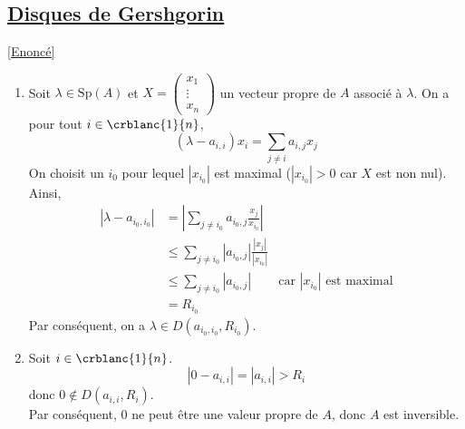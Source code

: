 \documentclass[8pt]{book}
\begin{document}
	\subsection{\underline{Disques de Gershgorin} }
	\label{Disques de Gershgorin corrigé}
	\textcolor{blue}{\hyperref[Disques de Gershgorin]{[Enoncé]}}\\
	\begin{enumerate}[leftmargin=*]
			\item Soit $\lambda\in\text{Sp}(A)$ et $X=\begin{pmatrix}
			x_1\\ \vdots \\ x_n
				\end{pmatrix}$ un vecteur propre de $A$ associé à $\lambda$.
			On a pour tout $i\in\crblanc{1}{n}$, \[(\lambda-a_{i,i})x_i=\sum_{j\ne i}a_{i,j}x_j\]
			On choisit un $i_0$ pour lequel $|x_{i_0}|$ est maximal ($|x_{i_0}|>0$ car $X$ est non nul). Ainsi, 
			\begin{align*}
				|\lambda-a_{i_0,i_0}|&=\left|\sum_{j\ne i_0}a_{i_0,j}\frac{x_j}{x_{i_0}}\right|\\
				&\leq\sum_{j\ne i_0}|a_{i_0,j}|\frac{|x_j|}{|x_{i_0}|}\\
				&\leq\sum_{j\ne i_0}|a_{i_0,j}|&\mbox{car $|x_{i_0}|$ est maximal}\\
				&=R_{i_0}
			\end{align*}
			Par conséquent, on a $\lambda \in D(a_{i_0,i_0},R_{i_0})$.
			\item Soit $i\in\crblanc{1}{n}$.\\
			\[|0-a_{i,i}|=|a_{i,i}|>R_i\]
			donc $0\not\in D(a_{i,i},R_i)$.\\
			Par conséquent, $0$ ne peut être une valeur propre de $A$, donc $A$ est  inversible.
	\end{enumerate}
	
\end{document}
